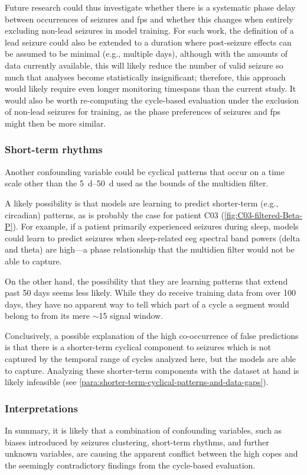 Future research could thus investigate whether there is a systematic phase delay between occurrences of seizures and \glspl{fp} and whether this changes when entirely excluding non-lead seizures in model training.
For such work, the definition of a lead seizure could also be extended to a duration where post-seizure effects can be assumed to be minimal (e.g., multiple days), although with the amounts of data currently available, this will likely reduce the number of valid seizure so much that analyses become statistically insignificant; therefore, this approach would likely require even longer monitoring timespans than the current study.
It would also be worth re-computing the cycle-based evaluation under the exclusion of non-lead seizures for training, as the phase preferences of seizures and \glspl{fp} might then be more similar.


\subsubsection{Short-term rhythms}
Another confounding variable could be cyclical patterns that occur on a time scale other than the \SIrange{5}{50}{\day} used as the bounds of the multidien filter.

A likely possibility is that models are learning to predict shorter-term (e.g., circadian) patterns, as is probably the case for patient C03 (\cref{fig:C03-filtered-Beta-P}).
For example, if a patient primarily experienced seizures during sleep, models could learn to predict seizures when sleep-related \gls{eeg} spectral band powers (delta and theta) are high---a phase relationship that the multidien filter would not be able to capture.

On the other hand, the possibility that they are learning patterns that extend past 50 days seems less likely.
While they do receive training data from over 100 days, they have no apparent way to tell which part of a cycle a segment would belong to from its mere $\sim$\SI{15}{\sec} signal window.

Conclusively, a possible explanation of the high co-occurrence of false predictions is that there is a shorter-term cyclical component to seizures which is not captured by the temporal range of cycles analyzed here, but the models are able to capture.
Analyzing these shorter-term components with the dataset at hand is likely infeasible (see \cref{para:shorter-term-cyclical-patterns-and-data-gaps}).

\subsubsection{Interpretations}
In summary, it is likely that a combination of confounding variables, such as biases introduced by seizures clustering, short-term rhythms, and further unknown variables, are causing the apparent conflict between the high \glspl{cope} and the seemingly contradictory findings from the cycle-based evaluation.

